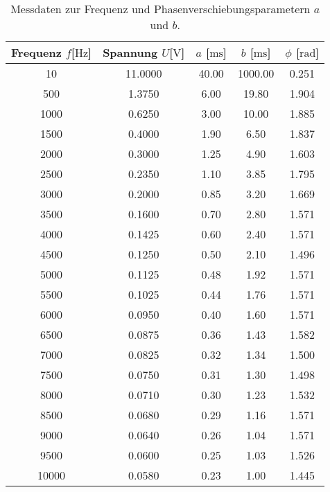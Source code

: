         \begin{table}
            \centering
            \caption{Messdaten zur Frequenz und Phasenverschiebungsparametern $a$ und $b$.}
            \label{tab:freq}
            \begin{tabular}{c c c c c}
                \toprule
                Frequenz $f$[$\si{\hertz}$] & Spannung $U$[$\si{\volt}$] & $a$ [$\si{\milli\second}$] & $b$ [$\si{\milli\second}$] & $\phi$ [$ \si{\radian}$]  \\
                \midrule
                10      &	11.0000       &       40.00  &       1000.00 & 0.251\\        
                500     &	1.3750        &       6.00   &       19.80   & 1.904  \\
                1000    &	0.6250        &       3.00   &       10.00   & 1.885     \\
                1500    &	0.4000        &       1.90   &       6.50    & 1.837     \\
                2000    &	0.3000        &       1.25   &       4.90    & 1.603     \\  
                2500    &	0.2350        &       1.10   &     3.85      & 1.795   \\   
                3000    &	0.2000        &       0.85   &    3.20       & 1.669\\  
                3500    &	0.1600        &       0.70   &     2.80      & 1.571 \\  
                4000    &	0.1425        &       0.60   &     2.40      & 1.571     \\   
                4500    &	0.1250        &       0.50   &     2.10      & 1.496     \\   
                5000    &	0.1125        &       0.48   &    1.92       & 1.571 \\     
                5500    &	0.1025        &       0.44   &    1.76       & 1.571 \\     
                6000    &	0.0950        &       0.40   &     1.60      & 1.571     \\   
                6500    &	0.0875        &       0.36   &    1.43       & 1.582     \\     
                7000    &	0.0825        &       0.32   &    1.34       & 1.500     \\     
                7500    &	0.0750        &       0.31   &    1.30       & 1.498 \\    
                8000    &	0.0710        &       0.30   &     1.23      & 1.532     \\   
                8500    &	0.0680        &       0.29   &    1.16       & 1.571         \\    
                9000    &	0.0640        &       0.26   &    1.04       & 1.571   \\    
                9500    &	0.0600        &       0.25   &    1.03       & 1.526         \\   
                10000   &	0.0580        &       0.23   &    1.00       & 1.445 \\    
                \bottomrule
            \end{tabular}
            \end{table}